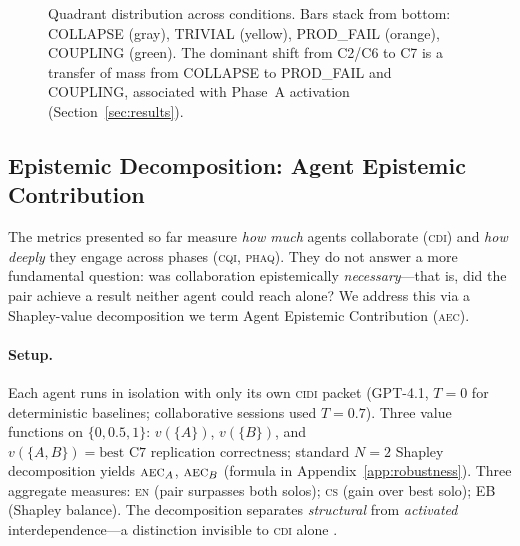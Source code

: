 \documentclass{article}
\newcommand{\CDI}{\textsc{cdi}}
\newcommand{\CQI}{\textsc{cqi}}
\newcommand{\PhAQ}{\textsc{phaq}}
\newcommand{\CIDI}{\textsc{cidi}}
\newcommand{\AEC}{\textsc{aec}}
\newcommand{\EN}{\textsc{en}}
\newcommand{\CS}{\textsc{cs}}
\begin{document}
\begin{figure}[t]
  \centering
  \caption{Quadrant distribution across conditions. Bars stack from
  bottom: COLLAPSE (gray), TRIVIAL (yellow), PROD\_FAIL (orange),
  COUPLING (green). The dominant shift from C2/C6 to C7 is a transfer
  of mass from COLLAPSE to PROD\_FAIL and COUPLING, associated with
  Phase~A activation (Section~\ref{sec:results}).}
  \label{fig:quadrants}
\end{figure}

\subsection{Epistemic Decomposition: Agent Epistemic Contribution}
\label{sec:aec}

The metrics presented so far measure \emph{how much} agents collaborate
(\CDI) and \emph{how deeply} they engage across phases (\CQI, \PhAQ).
They do not answer a more fundamental question: was collaboration
epistemically \emph{necessary}---that is, did the pair achieve a result
neither agent could reach alone? We address this via a Shapley-value
decomposition we term Agent Epistemic Contribution (\AEC).

\paragraph{Setup.}
Each agent runs in isolation with only its own \CIDI{} packet (GPT-4.1,
$T=0$ for deterministic baselines; collaborative sessions used $T=0.7$).
Three value functions on $\{0, 0.5, 1\}$: $v(\{A\})$, $v(\{B\})$, and
$v(\{A,B\}) = \text{best C7 replication correctness}$; standard $N=2$
Shapley decomposition yields $\AEC_A$, $\AEC_B$ (formula in
Appendix~\ref{app:robustness}). Three aggregate measures: \EN{}
(pair surpasses both solos); \CS{} (gain over best solo);
EB (Shapley balance). The decomposition separates \emph{structural}
from \emph{activated} interdependence---a distinction invisible to \CDI{} alone \citep{swiecki2021measuring}.
\end{document}
